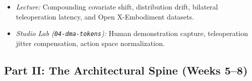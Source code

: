 \documentclass[
  9pt,
  letterpaper,
  open=right,
  numbers=noenddot,
  captions=tableheading]{scrbook}
\makeatletter
\providecommand{\tightlist}{%
  \setlength{\itemsep}{0pt}\setlength{\parskip}{0pt}}
\def\tightlist{}
\let\tightlist\relax
\newif\ifmlsys@inside@longtable
\newif\ifmlsys@longtable@numbered
\let\mlsys@orig@label\label
\renewcommand{\label}[1]{%
  \ifmlsys@inside@longtable
    \global\mlsys@longtable@numberedtrue
  \fi
  \mlsys@orig@label{#1}%
}
\let\label\mlsys@orig@label
\makeatother
\begin{document}
\begin{itemize}
  \begin{itemize}
  \tightlist
  \item
    \emph{Lecture:} Compounding covariate shift, distribution drift,
    bilateral teleoperation latency, and Open X-Embodiment datasets.
  \item
    \emph{Studio Lab (\texttt{04-dma-tokens}):} Human demonstration
    capture, teleoperation jitter compensation, action space
    normalization.
  \end{itemize}
\end{itemize}

\subsection*{Part II: The Architectural Spine (Weeks
5--8)}\label{part-ii-the-architectural-spine-weeks-58}
\end{document}

